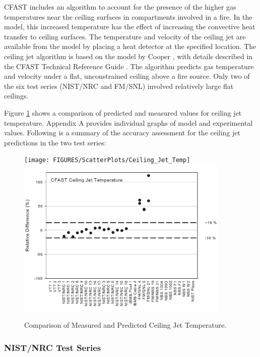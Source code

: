 CFAST includes an algorithm to account for the presence of the higher gas temperatures near the ceiling surfaces in compartments involved in a fire.  In the model, this increased temperature has the effect of increasing the convective heat transfer to ceiling surfaces.  The temperature and velocity of the ceiling jet are available from the model by placing a heat detector at the specified location.  The ceiling jet algorithm is based on the model by Cooper \cite{Cooper:1991}, with details described in the CFAST Technical Reference Guide \cite{CFAST_Tech_Guide_6}.  The algorithm predicts gas temperature and velocity under a flat, unconstrained ceiling above a fire source.  Only two of the six test series (NIST/NRC and FM/SNL) involved relatively large flat ceilings.  

Figure \ref{fig:Ceiling_Jet_Scatter} shows a comparison of predicted and measured values for ceiling jet temperature. Appendix A provides individual graphs of model and experimental values. Following is a summary of the accuracy assessment for the ceiling jet predictions in the two test series:

\begin{figure}
\begin{center}
\texttt{[image: FIGURES/ScatterPlots/Ceiling\_Jet\_Temp]}  \\
\includegraphics[width=4.0in]{FIGURES/Relative_Diff/Ceiling_Jet}
\end{center}
\caption{Comparison of Measured and Predicted Ceiling Jet Temperature.} \label{fig:Ceiling_Jet_Scatter}
\end{figure}

\subsubsection{NIST/NRC Test Series}

